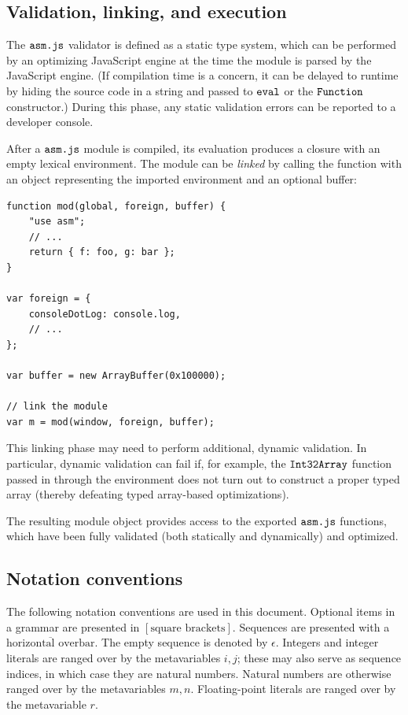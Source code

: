 \documentclass{article}
\newcommand{\seq}[1]{\overline{{#1}}}
\newcommand{\mathjs}[1]{\mbox{\texttt{{#1}}}}
\begin{document}
\subsection{Validation, linking, and execution}

The $\mathjs{asm.js}$ validator is defined as a static type system,
which can be performed by an optimizing JavaScript engine at the time
the module is parsed by the JavaScript engine. (If compilation time is
a concern, it can be delayed to runtime by hiding the source code in a
string and passed to $\mathjs{eval}$ or the $\mathjs{Function}$
constructor.) During this phase, any static validation errors can be
reported to a developer console.

After a $\mathjs{asm.js}$ module is compiled, its evaluation produces
a closure with an empty lexical environment. The module can be {\it
linked} by calling the function with an object representing the
imported environment and an optional buffer:
\begin{verbatim}
function mod(global, foreign, buffer) {
    "use asm";
    // ...
    return { f: foo, g: bar };
}

var foreign = {
    consoleDotLog: console.log,
    // ...
};

var buffer = new ArrayBuffer(0x100000);

// link the module
var m = mod(window, foreign, buffer);
\end{verbatim}

This linking phase may need to perform additional, dynamic
validation. In particular, dynamic validation can fail if, for
example, the $\mathjs{Int32Array}$ function passed in through the
environment does not turn out to construct a proper typed array
(thereby defeating typed array-based optimizations).

The resulting module object provides access to the exported
$\mathjs{asm.js}$ functions, which have been fully validated (both
statically and dynamically) and optimized.

\subsection{Notation conventions}

The following notation conventions are used in this document. Optional
items in a grammar are presented in $[\mbox{square
brackets}]$. Sequences are presented with a $\seq{\mbox{horizontal
overbar}}$. The empty sequence is denoted by $\epsilon$. Integers and
integer literals are ranged over by the metavariables $i, j$;
these may also serve as sequence indices, in which case they are
natural numbers. Natural numbers are otherwise ranged over by the
metavariables $m, n$. Floating-point literals are ranged over by the
metavariable $r$.
\end{document}
